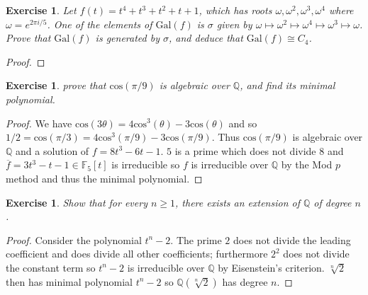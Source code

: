 \documentclass{article}
\newtheorem{exercise}[theorem]{Exercise}
\begin{document}
\begin{exercise}
Let $f(t)=t^4+t^3+t^2+t+1$, which has roots $\omega,\omega^2,\omega^3,\omega^4$ where $\omega=e^{2\pi i/5}$. One of the elements of $\text{Gal}(f)$ is $\sigma$ given by $\omega\mapsto\omega^2\mapsto\omega^4\mapsto\omega^3\mapsto\omega$. Prove that $\text{Gal}(f)$ is generated by $\sigma$, and deduce that $\text{Gal}(f)\cong C_4$.
\end{exercise}
\begin{proof}

\end{proof}

\begin{exercise}
prove that $\text{cos}(\pi/9)$ is algebraic over $\mathbb{Q}$, and find its minimal polynomial.
\end{exercise}
\begin{proof}
We have $\text{cos}(3\theta)=4\text{cos}^3(\theta)-3\text{cos}(\theta)$ and so $1/2=\text{cos}(\pi/3)=4\text{cos}^3(\pi/9)-3\text{cos}(\pi/9)$. Thus $\text{cos}(\pi/9)$ is algebraic over $\mathbb{Q}$ and a solution of $f=8t^3-6t-1$. $5$ is a prime which does not divide $8$ and $\overline{f}=3t^3-t-1\in\mathbb{F}_5[t]$ is irreducible so $f$ is irreducible over $\mathbb{Q}$ by the Mod $p$ method and thus the minimal polynomial.
\end{proof}

\begin{exercise}
Show that for every $n\geq1$, there exists an extension of $\mathbb{Q}$ of degree $n$.
\end{exercise}
\begin{proof}
Consider the polynomial $t^n-2$. The prime $2$ does not divide the leading coefficient and does divide all other coefficients; furthermore $2^2$ does not divide the constant term so $t^n-2$ is irreducible over $\mathbb{Q}$ by Eisenstein's criterion. $\sqrt[n]{2}$ then has minimal polynomial $t^n-2$ so $\mathbb{Q}(\sqrt[n]{2})$ has degree $n$.
\end{proof}
\end{document}
